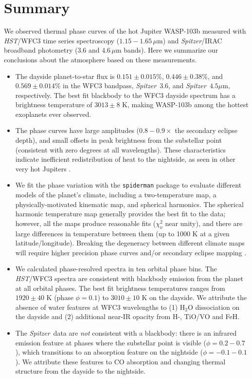 \documentclass[twocolumn]{aastex61}
\newcommand{\project}[1]{\textsl{#1}}
\newcommand{\HST}{\project{HST}}
\newcommand{\Spitzer}{\project{Spitzer}}
\begin{document}
\section{Summary}
\label{sec:summary}
We observed thermal phase curves of the hot Jupiter WASP-103b measured with \HST/WFC3 time series spectroscopy ($1.15 - 1.65\,\mu$m) and \Spitzer/IRAC broadband photometry ($3.6$ and $4.6\,\mu$m bands). Here we summarize our conclusions about the atmosphere based on these measurements.

\begin{itemize}
	\item{The dayside planet-to-star flux is $0.151\pm0.015\%$, $0.446\pm0.38\%$, and $0.569\pm0.014\%$ in the WFC3 bandpass, \Spitzer\ $3.6$, and \Spitzer\ $4.5\mu$m, respectively.  The best fit blackbody to the WFC3 dayside spectrum has a brightness temperature of $3013 \pm 8$ K, making WASP-103b among the hottest exoplanets ever observed.}
	\item{The phase curves have large amplitudes ($0.8 -0.9\times$ the secondary eclipse depth), and small offsets in peak brightness from the substellar point (consistent with zero degrees at all wavelengths). These characteristics indicate inefficient redistribution of heat to the nightside, as seen in other very hot Jupiters \citep{komacek17}.}
	\item{We fit the phase variation with the \texttt{spiderman} package \citep{louden17} to evaluate different models of the planet's climate, including a two-temperature map, a physically-motivated kinematic map, and spherical harmonics. The spherical harmonic temperature map generally provides the best fit to the data; however, all the maps produce reasonable fits ($\chi^2_\nu$ near unity), and there are large differences in temperature between them (up to 1000 K at a given latitude/longitude). Breaking the degeneracy between different climate maps will require higher precision phase curves and/or secondary eclipse mapping \citep[e.g.][]{dewit12}.}
\item{We calculated phase-resolved spectra in ten orbital phase bins. The \HST/WFC3 spectra are consistent with  blackbody emission from the planet at all orbital phases. The best fit brightness temperatures ranges from $1920\pm40$ K (phase $\phi = 0.1$) to $3010\pm10$ K on the dayside. We attribute the absence of water features at WFC3 wavelengths to (1) H$_2$O dissociation on the dayside and (2) additional near-IR opacity from H-, TiO/VO and FeH.}
\item{The \Spitzer\ data are \emph{not} consistent with a blackbody: there is an infrared emission feature at phases where the substellar point is visible ($\phi = 0.2 - 0.7$), which transitions to an absorption feature on the nightside ($\phi = -0.1 - 0.1$). We attribute these features to CO absorption and changing thermal structure from the dayside to the nightside.}

\end{itemize}
\end{document}
